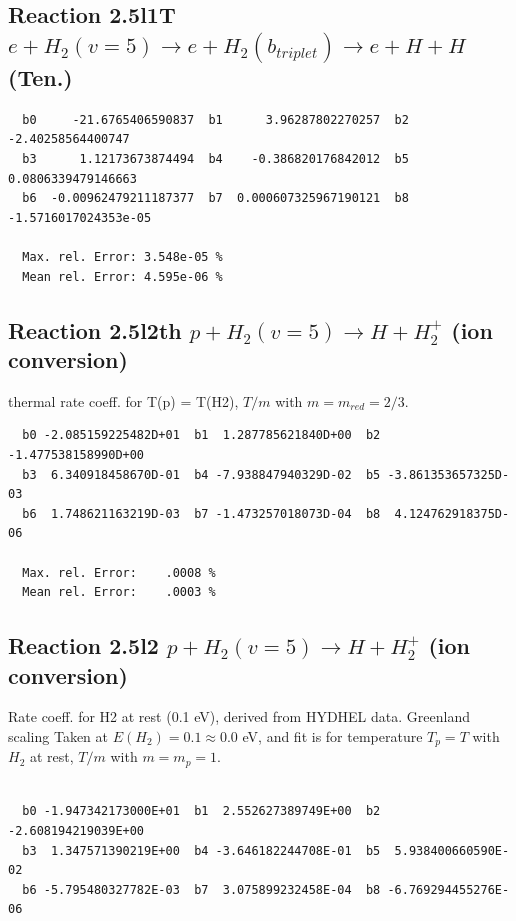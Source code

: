 \documentclass[12pt,dvipdfmx]{article}
\begin{document}
\subsection{
Reaction 2.5l1T
$  e + H_2(v=5) \rightarrow e +  H_2(b_{triplet})\rightarrow e + H + H $ (Ten.)
}

\begin{small}\begin{verbatim}
  b0     -21.6765406590837  b1      3.96287802270257  b2     -2.40258564400747
  b3      1.12173673874494  b4    -0.386820176842012  b5    0.0806339479146663
  b6  -0.00962479211187377  b7  0.000607325967190121  b8  -1.5716017024353e-05

  Max. rel. Error: 3.548e-05 %
  Mean rel. Error: 4.595e-06 %
\end{verbatim}\end{small}


\subsection{
Reaction 2.5l2th
$ p + H_2(v=5) \rightarrow H + H_2^+$ (ion conversion)
}
thermal rate coeff. for T(p) = T(H2),
$T/m$ with $m=m_{red}=2/3$.

\begin{small}\begin{verbatim}
  b0 -2.085159225482D+01  b1  1.287785621840D+00  b2 -1.477538158990D+00
  b3  6.340918458670D-01  b4 -7.938847940329D-02  b5 -3.861353657325D-03
  b6  1.748621163219D-03  b7 -1.473257018073D-04  b8  4.124762918375D-06

  Max. rel. Error:    .0008 %
  Mean rel. Error:    .0003 %

\end{verbatim}\end{small}

\subsection{
Reaction 2.5l2
$ p + H_2(v=5) \rightarrow H + H_2^+$ (ion conversion)
}
Rate coeff. for H2 at rest (0.1 eV), derived from HYDHEL data. Greenland scaling
Taken at $E(H_2) = 0.1 \approx 0.0$ eV,  and fit is for temperature $T_p=T$ with $H_2$ at rest,
$T/m$ with $m=m_p=1$.

\begin{small}\begin{verbatim}

  b0 -1.947342173000E+01  b1  2.552627389749E+00  b2 -2.608194219039E+00
  b3  1.347571390219E+00  b4 -3.646182244708E-01  b5  5.938400660590E-02
  b6 -5.795480327782E-03  b7  3.075899232458E-04  b8 -6.769294455276E-06

\end{verbatim}\end{small}
\end{document}

